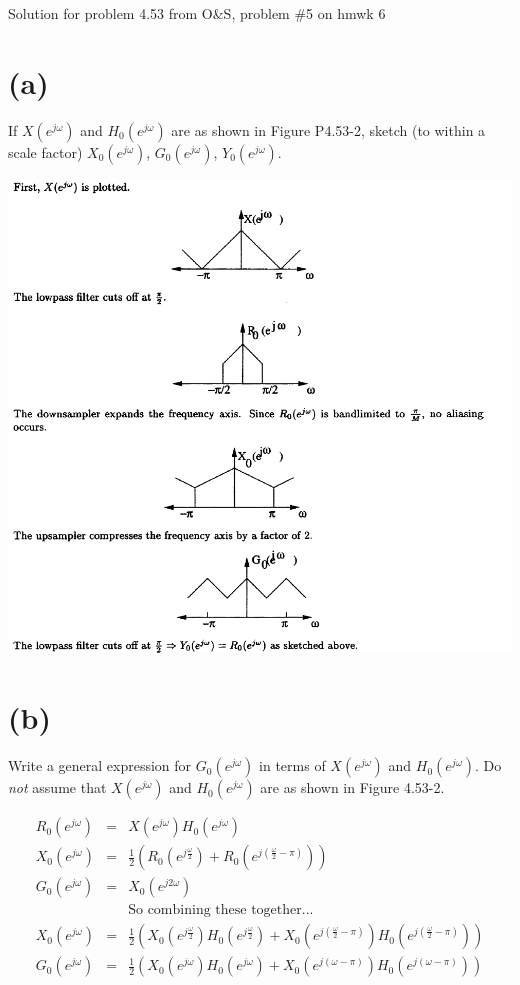 \documentclass[11pt]{article}
\begin{document}
Solution for problem 4.53 from O\&S, problem \#5 on hmwk 6

\section*{(a)}

If $X(e^{j\omega })$ and $H_0(e^{j\omega })$ are as shown in Figure P4.53-2, sketch (to within a scale factor) $X_0(e^{j\omega })$, $G_0(e^{j\omega })$, $Y_0(e^{j\omega })$.

\includegraphics[width=\textwidth]{hmwk6_p5_a.png} 

\section*{(b)}
Write a general expression for $G_0(e^{j\omega })$ in terms of $X(e^{j\omega })$ and $H_0(e^{j\omega })$. Do \textit{not} assume that $X(e^{j\omega })$ and $H_0(e^{j\omega })$ are as shown in Figure 4.53-2.

\begin{eqnarray*}
R_0(e^{j\omega }) &=& X(e^{j\omega })H_0(e^{j\omega }) \\
X_0(e^{j\omega }) &=& \frac{1}{2}\left(R_0\left(e^{j\frac{\omega}{2}}\right)+R_0\left(e^{j\left(\frac{\omega}{2}-\pi\right) }\right) \right) \\
G_0(e^{j\omega}) &=& X_0(e^{j2\omega}) \\
&& \text{So combining these together...} \\
X_0(e^{j\omega}) &=& \frac{1}{2}\left(X_0\left(e^{j\frac{\omega}{2}}\right)H_0\left(e^{j\frac{\omega}{2}}\right)+X_0\left(e^{j\left(\frac{\omega}{2}-\pi\right) }\right) H_0\left(e^{j\left(\frac{\omega}{2}-\pi\right) }\right)\right) \\
G_0(e^{j\omega}) &=& \frac{1}{2}\left(X_0\left(e^{j\omega}\right)H_0\left(e^{j\omega}\right)+X_0\left(e^{j\left(\omega-\pi\right) }\right) H_0\left(e^{j\left(\omega-\pi\right) }\right)\right) \\
\end{eqnarray*}
\end{document}
